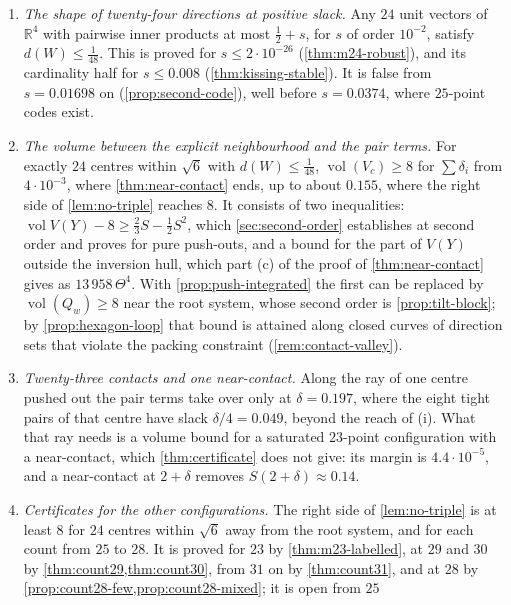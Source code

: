 \documentclass[11pt,reqno]{amsart}
\renewcommand{\_}{\origunderscore\allowbreak}
\numberwithin{equation}{section}
\theoremstyle{plain}
\theoremstyle{definition}
\theoremstyle{remark}
\DeclareMathOperator{\vol}{vol}
\begin{document}
\begin{enumerate}[label=\textup{(\roman*)},leftmargin=2.2em]
\item \emph{The shape of twenty-four directions at positive slack.} Any
  $24$ unit vectors of $\mathbb{R}^4$ with pairwise inner products at most
  $\tfrac12+s$, for $s$ of order $10^{-2}$, satisfy $d(W)\le\frac1{48}$.
  This is proved for $s\le2\cdot10^{-26}$ (\cref{thm:m24-robust}), and its
  cardinality half for $s\le0.008$ (\cref{thm:kissing-stable}). It is
  false from $s=0.01698$ on (\cref{prop:second-code}), well before
  $s=0.0374$, where $25$-point codes exist.
\item \emph{The volume between the explicit neighbourhood and the pair
  terms.} For exactly $24$ centres within $\sqrt6$ with $d(W)\le\frac1{48}$,
  $\vol(V_c)\ge8$ for $\sum\delta_i$ from $4\cdot10^{-3}$, where
  \cref{thm:near-contact} ends, up to about $0.155$, where the right side
  of \cref{lem:no-triple} reaches $8$. It consists of two inequalities:
  $\vol V(Y)-8\ge\frac23S-\frac12S^2$, which \cref{sec:second-order}
  establishes at second order and proves for pure push-outs, and a bound
  for the part of $V(Y)$ outside the inversion hull, which part (c) of the
  proof of \cref{thm:near-contact} gives as $13\,958\,\Theta^4$. With
  \cref{prop:push-integrated} the first can be replaced by
  $\vol(Q_w)\ge8$ near the root system, whose second order is
  \cref{prop:tilt-block}; by \cref{prop:hexagon-loop} that bound is
  attained along closed curves of direction sets that violate the packing
  constraint (\cref{rem:contact-valley}).
\item \emph{Twenty-three contacts and one near-contact.} Along the ray of
  one centre pushed out the pair terms take over only at $\delta=0.197$,
  where the eight tight pairs of that centre have slack $\delta/4=0.049$,
  beyond the reach of (i). What that ray needs is a volume bound for a
  saturated $23$-point configuration with a near-contact, which
  \cref{thm:certificate} does not give: its margin is $4.4\cdot10^{-5}$,
  and a near-contact at $2+\delta$ removes $S(2+\delta)\approx0.14$.
\item \emph{Certificates for the other configurations.} The right side of
  \cref{lem:no-triple} is at least $8$ for $24$ centres within $\sqrt6$
  away from the root system, and for each count from $25$ to $28$. It is
  proved for $23$ by \cref{thm:m23-labelled}, at $29$ and $30$ by
  \cref{thm:count29,thm:count30}, from $31$ on by \cref{thm:count31}, and at
  $28$ by \cref{prop:count28-few,prop:count28-mixed}; it is open from $25$

\end{enumerate}
\end{document}
